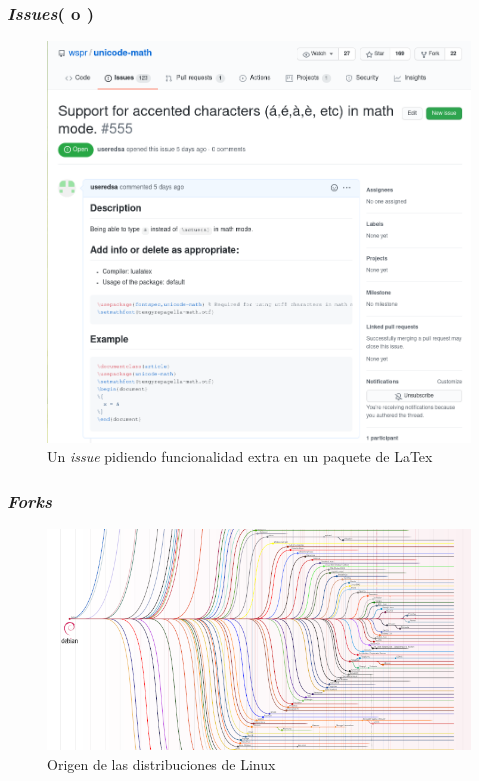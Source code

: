 \begin{frame}\frametitle{\textit{Issues}(\GitHub{} o \GitLab{})}
\begin{figure}[h]
    \centering
    \includegraphics[height=0.7\pageheight]{images/issue-example.png}
    \caption{Un \textit{issue} pidiendo funcionalidad extra en un paquete de LaTex}
\end{figure}

\href{https://github.com/wspr/unicode-math/issues/555}{}
\end{frame}

\begin{frame}\frametitle{\textit{Forks}}
\begin{figure}[h]
    \centering
    \includegraphics[height=0.65\pageheight]{images/Linux_Distribution_Timeline.png}
    \caption{Origen de las distribuciones de Linux}
\end{figure}

\href{https://upload.wikimedia.org/wikipedia/commons/1/1b/Linux_Distribution_Timeline.svg}{}
\end{frame}

